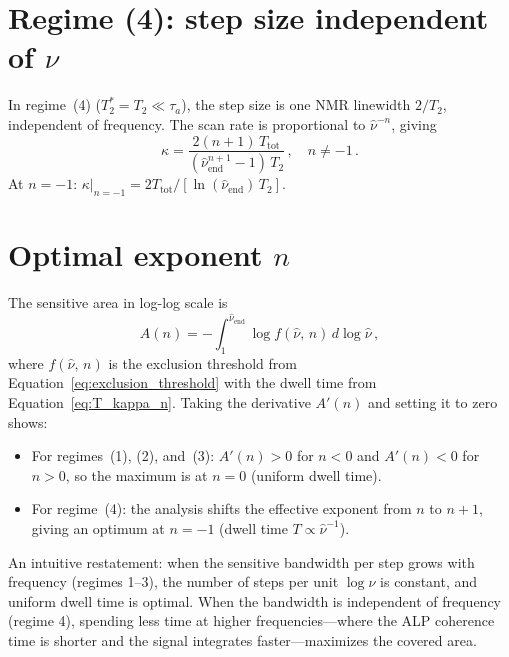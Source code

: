 \section*{Regime (4): step size independent of $\nu$}

In regime~(4) ($T_2^*=T_2 \ll \tau_a$), the step size is one NMR linewidth $2/T_2$, independent of frequency. The scan rate is proportional to $\hat{\nu}^{-n}$, giving
\begin{equation}
    \kappa = \dfrac{2(n+1)\,T_{\mathrm{tot}}}{(\hat{\nu}_{\mathrm{end}}^{n+1}-1)\,T_2}
    \,,\quad n \ne -1\,.
\end{equation}
At $n=-1$: $\kappa|_{n=-1} = 2T_{\mathrm{tot}}/[\ln(\hat{\nu}_{\mathrm{end}})\,T_2]$.

\section*{Optimal exponent $n$}

The sensitive area in log-log scale is
\begin{equation}
    A(n) = -\int_{1}^{\hat{\nu}_{\mathrm{end}}} \log f(\hat{\nu},\,n)\,d\log\hat{\nu}
    \,,\label{eq:A_n}
\end{equation}
where $f(\hat{\nu},\,n)$ is the exclusion threshold from Equation~\eqref{eq:exclusion_threshold} with the dwell time from Equation~\eqref{eq:T_kappa_n}. Taking the derivative $A'(n)$ and setting it to zero shows:
\begin{itemize}
    \item For regimes~(1), (2), and~(3): $A'(n) > 0$ for $n < 0$ and $A'(n) < 0$ for $n > 0$, so the maximum is at $n = 0$ (uniform dwell time).
    \item For regime~(4): the analysis shifts the effective exponent from $n$ to $n+1$, giving an optimum at $n = -1$ (dwell time $T \propto \hat{\nu}^{-1}$).
\end{itemize}

An intuitive restatement: when the sensitive bandwidth per step grows with frequency (regimes 1--3), the number of steps per unit $\log\nu$ is constant, and uniform dwell time is optimal. When the bandwidth is independent of frequency (regime 4), spending less time at higher frequencies---where the ALP coherence time is shorter and the signal integrates faster---maximizes the covered area.
